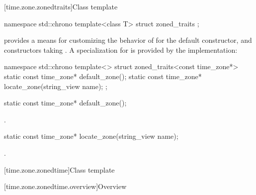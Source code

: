 [time.zone.zonedtraits]{Class template }

\begin{codeblock}
namespace std::chrono {
  template<class T> struct zoned_traits {};
}
\end{codeblock}

\pnum
{} provides a means for customizing
the behavior of 
for the  default constructor,
and constructors taking .
A specialization for  is provided by the implementation:
\begin{codeblock}
namespace std::chrono {
  template<> struct zoned_traits<const time_zone*> {
    static const time_zone* default_zone();
    static const time_zone* locate_zone(string_view name);
  };
}
\end{codeblock}

%
\begin{itemdecl}
static const time_zone* default_zone();
\end{itemdecl}

\begin{itemdescr}
\pnum
\returns
{}.
\end{itemdescr}

%
\begin{itemdecl}
static const time_zone* locate_zone(string_view name);
\end{itemdecl}

\begin{itemdescr}
\pnum
\returns
{}.
\end{itemdescr}

[time.zone.zonedtime]{Class template }

[time.zone.zonedtime.overview]{Overview}

